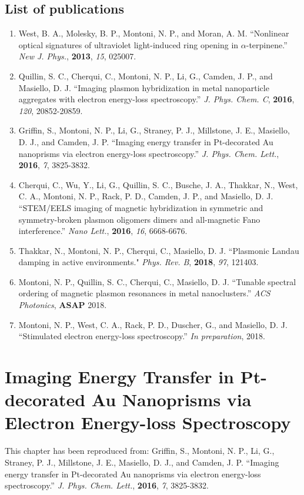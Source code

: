 \documentclass [11pt, proquest] {uwthesis}[2016/11/22]
\begin{document}
\section{List of publications}
\begin{enumerate}
\item West, B. A., Molesky, B. P., Montoni, N. P., and Moran, A. M. ``Nonlinear optical signatures of ultraviolet light-induced ring opening in $\alpha$-terpinene.'' {\it New J. Phys.}, {\bf 2013}, {\it 15}, 025007.
\item Quillin, S. C., Cherqui, C., Montoni, N. P., Li, G., Camden, J. P., and Masiello, D. J. ``Imaging plasmon hybridization in metal nanoparticle aggregates with electron energy-loss spectroscopy.'' {\it J. Phys. Chem. C}, {\bf 2016}, {\it 120}, 20852-20859.
\item Griffin, S., Montoni, N. P., Li, G., Straney, P. J., Millstone, J. E., Masiello, D. J., and Camden, J. P. ``Imaging energy transfer in Pt-decorated Au nanoprisms via electron energy-loss spectroscopy.'' {\it J. Phys. Chem. Lett.}, {\bf 2016}, {\it 7}, 3825-3832.
\item Cherqui, C., Wu, Y., Li, G., Quillin, S. C., Busche, J. A., Thakkar, N., West, C. A., Montoni, N. P., Rack, P. D., Camden, J. P., and Masiello, D. J. ``STEM/EELS imaging of magnetic hybridization in symmetric and symmetry-broken plasmon oligomers dimers and all-magnetic Fano interference.'' {\it Nano Lett.}, {\bf 2016}, {\it 16}, 6668-6676. 
\item Thakkar, N., Montoni, N. P., Cherqui, C., Masiello, D. J. ``Plasmonic Landau damping in active environments." {\it Phys. Rev. B}, {\bf 2018}, {\it 97}, 121403.
\item Montoni, N. P., Quillin, S. C., Cherqui, C., Masiello, D. J. ``Tunable spectral ordering of magnetic plasmon resonances in metal nanoclusters.'' {\it ACS Photonics}, {\bf ASAP} 2018.
\item Montoni, N. P., West, C. A., Rack, P. D., Duscher, G., and Masiello, D. J. ``Stimulated electron energy-loss spectroscopy.'' {\it In preparation}, 2018.
\end{enumerate}
 
\chapter{Imaging Energy Transfer in Pt-decorated Au Nanoprisms via Electron Energy-loss Spectroscopy}

This chapter has been reproduced from:
 Griffin, S., Montoni, N. P., Li, G., Straney, P. J., Millstone, J. E., Masiello, D. J., and Camden, J. P. ``Imaging energy transfer in Pt-decorated Au nanoprisms via electron energy-loss spectroscopy.'' {\it J. Phys. Chem. Lett.}, {\bf 2016}, {\it 7}, 3825-3832. \cite{me_prisms}
\end{document}

